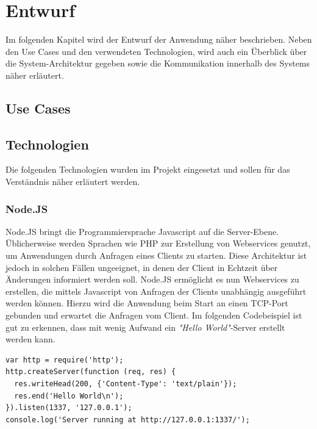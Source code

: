 \section{Entwurf}
Im folgenden Kapitel wird der Entwurf der Anwendung näher beschrieben. Neben den Use Cases und den verwendeten Technologien, wird auch ein Überblick über die System-Architektur gegeben sowie die Kommunikation innerhalb des Systems näher erläutert.

\subsection{Use Cases}

\subsection{Technologien}
Die folgenden Technologien wurden im Projekt eingesetzt und sollen für das Verständnis näher erläutert werden.

\subsubsection{Node.JS}
Node.JS \cite{nodejswebsite} bringt die Programmiersprache Javascript auf die Server-Ebene. Üblicherweise werden Sprachen wie PHP zur Erstellung von Webservices genutzt, um Anwendungen durch Anfragen eines Clients zu starten. Diese Architektur ist jedoch in solchen Fällen ungeeignet, in denen der Client in Echtzeit über Änderungen informiert werden soll. Node.JS ermöglicht es nun Webservices zu erstellen, die mittels Javascript von Anfragen der Clients unabhängig ausgeführt werden können. Hierzu wird die Anwendung beim Start an einen TCP-Port gebunden und erwartet die Anfragen vom Client. Im folgenden Codebeispiel ist gut zu erkennen, dass mit wenig Aufwand ein \textit{"Hello World"}-Server erstellt werden kann.

\begin{lstlisting}
var http = require('http');
http.createServer(function (req, res) {
  res.writeHead(200, {'Content-Type': 'text/plain'});
  res.end('Hello World\n');
}).listen(1337, '127.0.0.1');
console.log('Server running at http://127.0.0.1:1337/');
\end{lstlisting}

